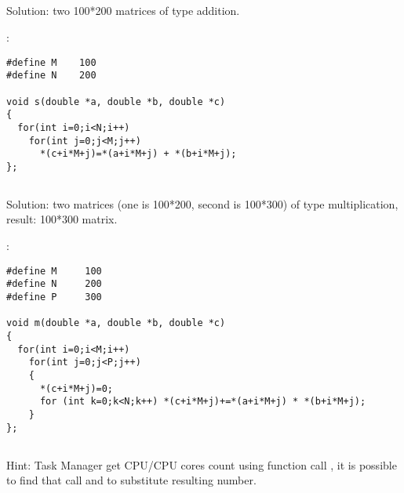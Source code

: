 \subsection{}

{Solution: two 100*200 matrices of \Tdouble type addition.}

:

\begin{lstlisting}
#define M    100
#define N    200

void s(double *a, double *b, double *c)
{
  for(int i=0;i<N;i++)
    for(int j=0;j<M;j++)
      *(c+i*M+j)=*(a+i*M+j) + *(b+i*M+j);
};
\end{lstlisting}

\subsection{}

{Solution: two matrices (one is 100*200, second is 100*300) of \Tdouble type multiplication, result: 100*300
matrix.}

:

\begin{lstlisting}
#define M     100
#define N     200
#define P     300

void m(double *a, double *b, double *c)
{
  for(int i=0;i<M;i++)
    for(int j=0;j<P;j++)
    {
      *(c+i*M+j)=0;
      for (int k=0;k<N;k++) *(c+i*M+j)+=*(a+i*M+j) * *(b+i*M+j);
    }
};
\end{lstlisting}

\subsection{}

{Hint: Task Manager get CPU/CPU cores count using function call 
, it is possible to find that
call and to substitute resulting number.}

